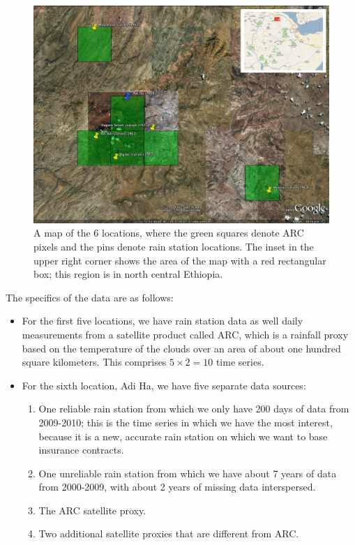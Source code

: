\documentclass[12pt]{article}
\begin{document}
\begin{figure}[htbp]
\begin{center}
\includegraphics[width=4.5in]{fig_ethiopia_papermap.jpg}
\caption{A map of the 6 locations, where the green squares denote ARC pixels and the pins denote rain station locations. The inset in the upper right corner shows the area of the map with a red rectangular box; this region is in north central Ethiopia.}
\label{fig_ethiopia_map}
\end{center}
\end{figure}

The specifics of the data are as follows:
\begin{itemize}
\item For the first five locations, we have rain station data as well daily measurements from a satellite product called ARC, which is a rainfall proxy based on the temperature of the clouds over an area of about one hundred square kilometers. This comprises $ 5 \times 2 = 10$ time series.
\item For the sixth location, Adi Ha, we have five separate data sources:
\begin{enumerate}
\item One reliable rain station from which we only have 200 days of data from 2009-2010; this is the time series in which we have the most interest, because it is a new, accurate rain station on which we want to base insurance contracts.
\item One unreliable rain station from which we have about 7 years of data from 2000-2009, with about 2 years of missing data interspersed.
\item The ARC satellite proxy.
\item Two additional satellite proxies that are different from ARC.
\end{enumerate}
\end{itemize}
\end{document}
